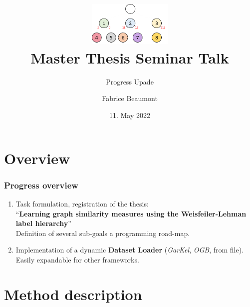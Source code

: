 

\title[MA Seminar Talk - Progress]{
	\centering
	\includegraphics[width=0.3\textwidth]{images/WLLT}\\
	Master Thesis Seminar Talk	
}
\subtitle{Progress Upade}
\author[F. Beaumont]{Fabrice Beaumont}
\date{11. May 2022}

\newcommand{\figureWidth}{7cm}
\newcommand{\figureHorizontal}{2cm}
\newcommand{\figureVertical}{5cm}



\begin{frame}
	\titlepage
\end{frame}

\section{Overview}

\begin{frame}
\frametitle{Progress overview} \vspace{-1cm}
	\begin{enumerate}
		\item Task formulation, registration of the thesis:\\
		\enquote{\textbf{Learning graph similarity measures using the Weisfeiler-Lehman label hierarchy}}\\
		Definition of several sub-goals a programming road-map.
		\newline
		\item Implementation of a dynamic \textbf{Dataset Loader} (\textit{GarKel}, \textit{OGB}, from file).\\
		Easily expandable for other frameworks.
	\end{enumerate}
\end{frame}

\section{Method description}

